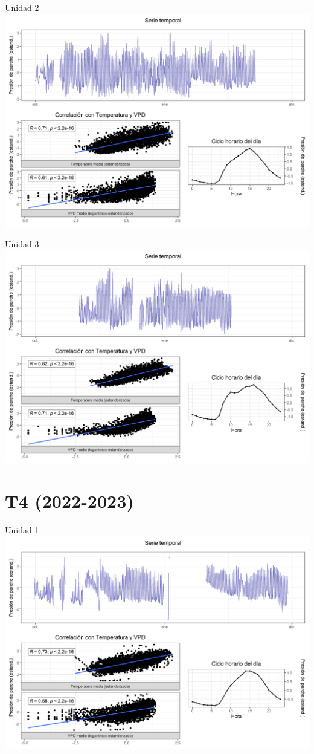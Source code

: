 \documentclass[
  letterpaper,
  DIV=11,
  numbers=noendperiod]{scrreprt}
\begin{document}
Unidad 2
\includegraphics{figuras/04_turgor_unidad/2022_2023_Rio_Claro_T3_Unidad_2.png}

Unidad 3
\includegraphics{figuras/04_turgor_unidad/2022_2023_Rio_Claro_T3_Unidad_3.png}

\chapter{T4 (2022-2023)}

Unidad 1
\includegraphics{figuras/04_turgor_unidad/2022_2023_Rio_Claro_T4_Unidad_1.png}
\end{document}
